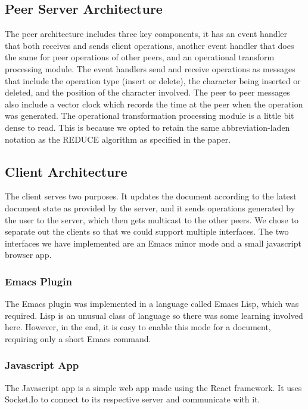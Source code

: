 \documentclass{article}
\begin{document}
\subsection{Peer Server Architecture}
The peer architecture includes three key components, it has an event handler that both receives and sends client operations, another event handler that does the same for peer operations of other peers, and an operational transform processing module. The event handlers send and receive operations as messages that include the operation type (insert or delete), the character being inserted or deleted, and the position of the character involved. The peer to peer messages also include a vector clock which records the time at the peer when the operation was generated. The operational transformation processing module is a little bit dense to read. This is because we opted to retain the same abbreviation-laden notation as the REDUCE algorithm as specified in the paper.\\

\subsection{Client Architecture}
The client serves two purposes. It updates the document according to the latest document state as provided by the server, and it sends operations generated by the user to the server, which then gets multicast to the other peers. We chose to separate out the clients so that we could support multiple interfaces. The two interfaces we have implemented are an Emacs minor mode and a small javascript browser app.\\

\subsubsection{Emacs Plugin}
The Emacs plugin was implemented in a language called Emacs Lisp, which was required. Lisp is an unusual class of language so there was some learning involved here. However, in the end, it is easy to enable this mode for a document, requiring only a short Emacs command.\\

\subsubsection{Javascript App}
The Javascript app is a simple web app made using the React framework. It uses Socket.Io to connect to its respective server and communicate with it.
\end{document}
